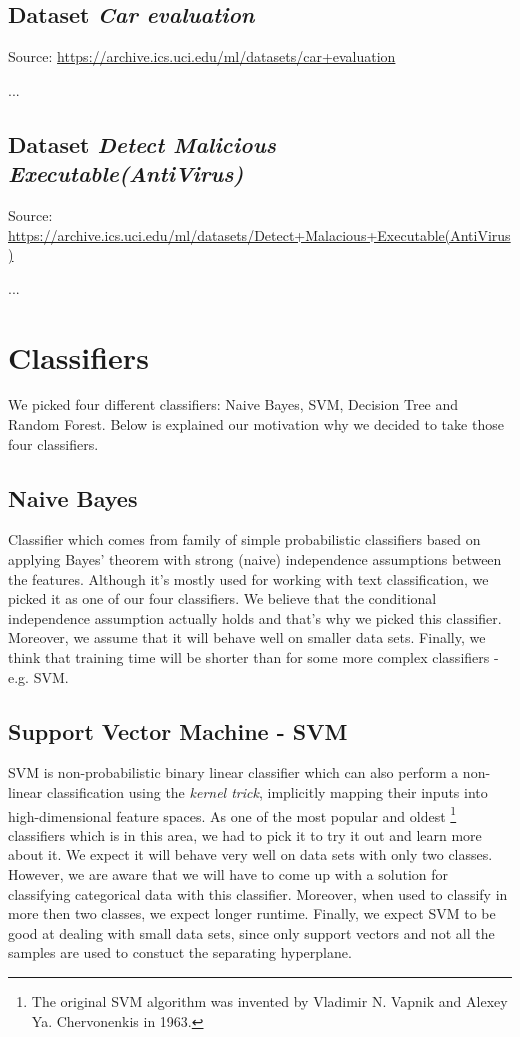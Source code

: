 \documentclass[11pt,a4paper,titlepage]{article}
\begin{document}
\subsection{Dataset \textit{Car evaluation}}
Source: \url{https://archive.ics.uci.edu/ml/datasets/car+evaluation}

...

\subsection{Dataset \textit{Detect Malicious Executable(AntiVirus)}}
Source: \url{https://archive.ics.uci.edu/ml/datasets/Detect+Malacious+Executable(AntiVirus)}

...


\section{Classifiers}
We picked four different classifiers: Naive Bayes, SVM, Decision Tree and Random Forest. Below is explained our motivation why we decided to take those four classifiers.

\subsection{Naive Bayes}
Classifier which comes from family of simple probabilistic classifiers based on applying Bayes' theorem with strong (naive) independence assumptions between the features. Although it's mostly used for working with text classification, we picked it as one of our four classifiers. We believe that the conditional independence assumption actually holds and that's why we picked this classifier. Moreover, we assume that it will behave well on smaller data sets. Finally, we think that training time will be shorter than for some more complex classifiers - e.g. SVM.

\subsection{Support Vector Machine - SVM}
SVM is non-probabilistic binary linear classifier which can also perform a non-linear classification using the \textit{kernel trick}, implicitly mapping their inputs into high-dimensional feature spaces. As one of the most popular and oldest \footnote{The original SVM algorithm was invented by Vladimir N. Vapnik and Alexey Ya. Chervonenkis in 1963.} classifiers which is in this area, we had to pick it to try it out and learn more about it. We expect it will behave very well on data sets with only two classes. However, we are aware that we will have to come up with a solution for classifying categorical data with this classifier. Moreover, when used to classify in more then two classes, we expect longer runtime. Finally, we expect SVM to be good at dealing with small data sets, since only support vectors and not all the samples are used to constuct the separating hyperplane. 
\end{document}
